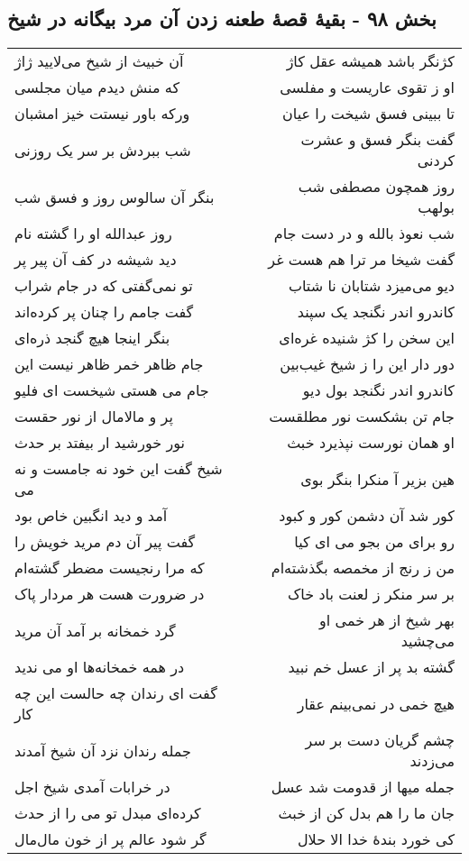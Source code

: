 \begin{center}
\section*{بخش ۹۸ - بقیهٔ قصهٔ طعنه زدن آن مرد بیگانه در شیخ}
\label{sec:sh098}
\begin{longtable}{l p{0.5cm} r}
آن خبیث از شیخ می‌لایید ژاژ
&&
کژنگر باشد همیشه عقل کاژ
\\
که منش دیدم میان مجلسی
&&
او ز تقوی عاریست و مفلسی
\\
ورکه باور نیستت خیز امشبان
&&
تا ببینی فسق شیخت را عیان
\\
شب ببردش بر سر یک روزنی
&&
گفت بنگر فسق و عشرت کردنی
\\
بنگر آن سالوس روز و فسق شب
&&
روز همچون مصطفی شب بولهب
\\
روز عبدالله او را گشته نام
&&
شب نعوذ بالله و در دست جام
\\
دید شیشه در کف آن پیر پر
&&
گفت شیخا مر ترا هم هست غر
\\
تو نمی‌گفتی که در جام شراب
&&
دیو می‌میزد شتابان نا شتاب
\\
گفت جامم را چنان پر کرده‌اند
&&
کاندرو اندر نگنجد یک سپند
\\
بنگر اینجا هیچ گنجد ذره‌ای
&&
این سخن را کژ شنیده غره‌ای
\\
جام ظاهر خمر ظاهر نیست این
&&
دور دار این را ز شیخ غیب‌بین
\\
جام می هستی شیخست ای فلیو
&&
کاندرو اندر نگنجد بول دیو
\\
پر و مالامال از نور حقست
&&
جام تن بشکست نور مطلقست
\\
نور خورشید ار بیفتد بر حدث
&&
او همان نورست نپذیرد خبث
\\
شیخ گفت این خود نه جامست و نه می
&&
هین بزیر آ منکرا بنگر بوی
\\
آمد و دید انگبین خاص بود
&&
کور شد آن دشمن کور و کبود
\\
گفت پیر آن دم مرید خویش را
&&
رو برای من بجو می ای کیا
\\
که مرا رنجیست مضطر گشته‌ام
&&
من ز رنج از مخمصه بگذشته‌ام
\\
در ضرورت هست هر مردار پاک
&&
بر سر منکر ز لعنت باد خاک
\\
گرد خمخانه بر آمد آن مرید
&&
بهر شیخ از هر خمی او می‌چشید
\\
در همه خمخانه‌ها او می ندید
&&
گشته بد پر از عسل خم نبید
\\
گفت ای رندان چه حالست این چه کار
&&
هیچ خمی در نمی‌بینم عقار
\\
جمله رندان نزد آن شیخ آمدند
&&
چشم گریان دست بر سر می‌زدند
\\
در خرابات آمدی شیخ اجل
&&
جمله میها از قدومت شد عسل
\\
کرده‌ای مبدل تو می را از حدث
&&
جان ما را هم بدل کن از خبث
\\
گر شود عالم پر از خون مال‌مال
&&
کی خورد بندهٔ خدا الا حلال
\\
\end{longtable}
\end{center}
